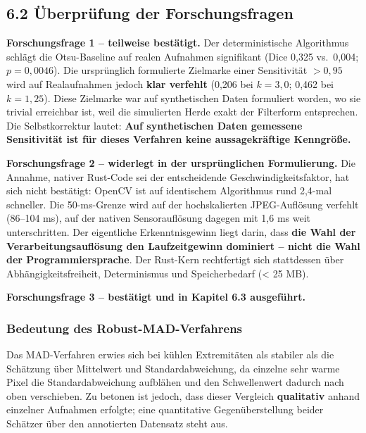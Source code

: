\documentclass[
  11pt,
]{article}
\begin{document}
\subsection{6.2 Überprüfung der
Forschungsfragen}\label{uxfcberpruxfcfung-der-forschungsfragen}

\textbf{Forschungsfrage 1 -- teilweise bestätigt.} Der deterministische
Algorithmus schlägt die Otsu-Baseline auf realen Aufnahmen signifikant
(Dice 0,325 vs.~0,004; \(p = 0{,}0046\)). Die ursprünglich formulierte
Zielmarke einer Sensitivität \(> 0{,}95\) wird auf Realaufnahmen jedoch
\textbf{klar verfehlt} (0,206 bei \(k = 3{,}0\); 0,462 bei
\(k = 1{,}25\)). Diese Zielmarke war auf synthetischen Daten formuliert
worden, wo sie trivial erreichbar ist, weil die simulierten Herde exakt
der Filterform entsprechen. Die Selbstkorrektur lautet: \textbf{Auf
synthetischen Daten gemessene Sensitivität ist für dieses Verfahren
keine aussagekräftige Kenngröße.}

\textbf{Forschungsfrage 2 -- widerlegt in der ursprünglichen
Formulierung.} Die Annahme, nativer Rust-Code sei der entscheidende
Geschwindigkeitsfaktor, hat sich nicht bestätigt: OpenCV ist auf
identischem Algorithmus rund 2,4-mal schneller. Die 50-ms-Grenze wird
auf der hochskalierten JPEG-Auflösung verfehlt (86--104 ms), auf der
nativen Sensorauflösung dagegen mit 1,6 ms weit unterschritten. Der
eigentliche Erkenntnisgewinn liegt darin, dass \textbf{die Wahl der
Verarbeitungsauflösung den Laufzeitgewinn dominiert -- nicht die Wahl
der Programmiersprache}. Der Rust-Kern rechtfertigt sich stattdessen
über Abhängigkeitsfreiheit, Determinismus und Speicherbedarf
(\textless{} 25 MB).

\textbf{Forschungsfrage 3 -- bestätigt und in Kapitel 6.3 ausgeführt.}

\subsubsection{Bedeutung des
Robust-MAD-Verfahrens}\label{bedeutung-des-robust-mad-verfahrens}

Das MAD-Verfahren erwies sich bei kühlen Extremitäten als stabiler als
die Schätzung über Mittelwert und Standardabweichung, da einzelne sehr
warme Pixel die Standardabweichung aufblähen und den Schwellenwert
dadurch nach oben verschieben. Zu betonen ist jedoch, dass dieser
Vergleich \textbf{qualitativ} anhand einzelner Aufnahmen erfolgte; eine
quantitative Gegenüberstellung beider Schätzer über den annotierten
Datensatz steht aus.
\end{document}
